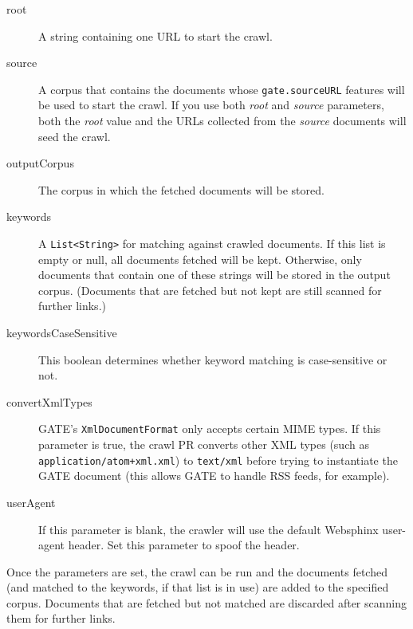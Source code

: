 \begin{description}
\item[root] A string containing one URL to start the crawl.
\item[source] A corpus that contains the documents whose
  \texttt{gate.sourceURL} features will be used to start the crawl.  If you
  use both \emph{root} and \emph{source} parameters, both the \emph{root}
  value and the URLs collected from the \emph{source} documents will seed the
  crawl.
\item[outputCorpus] The corpus in which the fetched documents will be stored.
\item[keywords] A \texttt{List<String>} for matching against crawled
  documents.  If this list is empty or null, all documents fetched will be
  kept.  Otherwise, only documents that contain one of these strings will be
  stored in the output corpus.  (Documents that are fetched but not kept are
  still scanned for further links.)
\item[keywordsCaseSensitive] This boolean determines whether keyword matching
  is case-sensitive or not.
\item[convertXmlTypes] GATE's \texttt{XmlDocumentFormat} only accepts certain
  MIME types.  If this parameter is true, the crawl PR converts other XML
  types (such as \texttt{application/atom+xml.xml}) to \texttt{text/xml}
  before trying to instantiate the GATE document (this allows GATE to handle
  RSS feeds, for example).
\item[userAgent] If this parameter is blank, the crawler will use the default
  Websphinx user-agent header.  Set this parameter to spoof the header.
\end{description}


Once the parameters are set, the crawl can be run and the documents fetched (and
matched to the keywords, if that list is in use) are added to the specified
corpus.  Documents that are fetched but not matched are discarded after scanning
them for further links.  


